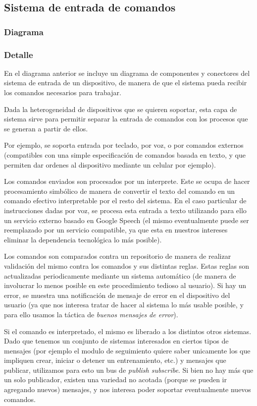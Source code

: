 \subsection{Sistema de entrada de comandos}
\subsubsection{Diagrama}


\subsubsection{Detalle}

En el diagrama anterior se incluye un diagrama de componentes y
conectores del sistema de entrada de un dispositivo, de manera de
que el sistema pueda recibir los comandos necesarios para trabajar.

Dada la heterogeneidad de dispositivos que se quieren soportar,
esta capa de sistema sirve para permitir separar la entrada de
comandos con los procesos que se generan a partir de ellos.

Por ejemplo, se soporta entrada por teclado, por voz, o por 
comandos externos (compatibles con una simple especificación de
comandos basada en texto, y que permiten dar ordenes al dispositivo
mediante un celular por ejemplo).

Los comandos enviados son procesados por un interprete. Este se 
ocupa de hacer procesamiento simbólico de manera de convertir el texto
del comando en un comando efectivo interpretable por el resto del
sistema. En el caso particular de instrucciones dadas por voz, se 
procesa esta entrada a texto utilizando para ello un servicio externo
basado en Google Speech (el mismo eventualmente puede ser reemplazado
por un servicio compatible, ya que esta en nuestros intereses eliminar
la dependencia tecnológica lo más posible).

Los comandos son comparados contra un repositorio de manera de 
realizar validación del mismo contra los comandos y sus distintas
reglas. Estas reglas son actualizadas periodicamente mediante un
sistema automático (de manera de involucrar lo menos posible 
en este procedimiento tedioso al usuario). Si hay un error, se 
muestra una notificación de mensaje de error en el dispositivo del
usuario (ya que nos interesa tratar de hacer al sistema lo más usable
posible, y para ello usamos la táctica de \textit{buenos mensajes de
error}). 

Si el comando es interpretado, el mismo es liberado a los distintos
otros sistemas. Dado que tenemos un conjunto de sistemas interesados
en ciertos tipos de mensajes (por ejemplo el modulo de seguimiento
quiere saber unicamente los que impliquen crear, iniciar o detener
un entrenamiento, etc.) y mensajes que publicar, utilizamos para esto
un bus de \textit{publish subscribe}. Si bien no hay más que un solo
publicador, existen una variedad no acotada (porque se pueden ir
agregando nuevos) mensajes, y nos interesa poder soportar eventualmente
nuevos comandos.

